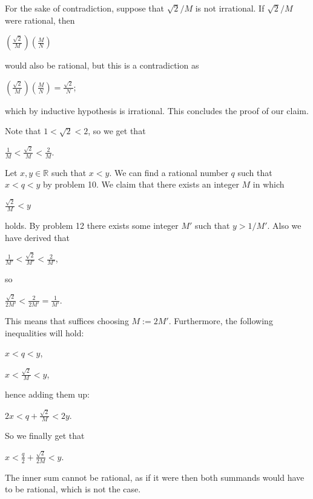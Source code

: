 \documentclass{article}
\theoremstyle{remark}
\begin{document}
\begin{enumerate}
            For the sake of contradiction, suppose that $\sqrt{2}/M$ is not irrational.
            If $\sqrt{2}/M$ were rational, then
            \begin{center}
                $\displaystyle \left(\frac{\sqrt{2}}{M}\right)\left(\frac{M}{N}\right)$
            \end{center}
            would also be rational, but this is a contradiction as 
            \begin{center}
                $\displaystyle \left(\frac{\sqrt{2}}{M}\right)\left(\frac{M}{N}\right) = \frac{\sqrt{2}}{N}$;
            \end{center}
            which by inductive hypothesis is irrational. This concludes the proof of our claim.

            Note that $1<\sqrt{2}<2$, so we get that 
            \begin{center}
                $\displaystyle \frac{1}{M} < \frac{\sqrt{2}}{M} < \frac{2}{M}$.
            \end{center} 
            Let $x, y \in \mathbb{R}$ such that $x < y$.
            We can find a rational number $q$ such that $x < q < y$ by problem 10.
            We claim that there exists an integer $M$ in which 
            \begin{center}
                $\displaystyle \frac{\sqrt{2}}{M} < y$
            \end{center}
            holds.
            By problem 12 there exists some integer $M'$ such that $y > 1/M'$.
            Also we have derived that 
            \begin{center}
                $\displaystyle \frac{1}{M'} < \frac{\sqrt{2}}{M'} < \frac{2}{M'}$,
            \end{center}
            so
            \begin{center}
                $\displaystyle \frac{\sqrt{2}}{2M'} < \frac{2}{2M'} = \frac{1}{M'}$.
            \end{center}
            This means that suffices choosing $M := 2M'$. Furthermore, the following inequalities will hold:
            \begin{center}
                $\displaystyle x < q < y$,
            \end{center}
            \begin{center}
                $\displaystyle x < \frac{\sqrt{2}}{M} < y$,
            \end{center}
            hence adding them up:
            \begin{center}
                $\displaystyle 2x < q+\frac{\sqrt{2}}{M} < 2y$.
            \end{center}
            So we finally get that
            \begin{center}
                $\displaystyle x < \frac{q}{2} + \frac{\sqrt{2}}{2M} < y$.
            \end{center}
            The inner sum cannot be rational, as if it were then both summands would have to be rational, which is not the case.


\end{enumerate}
\end{document}
